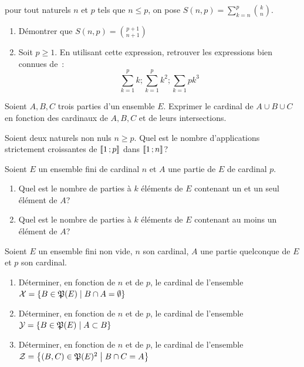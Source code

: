 \begin{exercice}
  pour tout naturels \(n\) et \(p\) tels que \(n \leqslant p\), on pose \(S(n,
  p) = \sum_{k = n}^p \binom{k}{n}\).
  \begin{enumerate}
    \item Démontrer que \(S(n, p) = \binom{p + 1}{n + 1}\)
    \item Soit \(p \geqslant 1\). En utilisant cette expression, retrouver les
      expressions bien connues de~: \[\sum_{k = 1}^p k ; \sum_{k = 1}^p k^2 ;
      \sum_{k = 1}{p} k^3\]
  \end{enumerate}
\end{exercice}

\begin{exercice}
  Soient \(A, B, C\) trois parties d'un ensemble \(E\). Exprimer le cardinal de
  \(A \cup B \cup C\) en fonction des cardinaux de \(A, B, C\) et de leurs
  intersections.
\end{exercice}

\begin{exercice}
  Soient deux naturels non nuls \(n\geqslant p\). Quel est le nombre
  d'applications strictement croissantes de \(\mathopen{\llbracket}1\mathclose{}\mathpunct{};p\mathclose{\rrbracket}\) dans
  \(\mathopen{\llbracket}1\mathclose{}\mathpunct{};n\mathclose{\rrbracket}\)?
\end{exercice}

\begin{exercice}
  Soient \(E\) un ensemble fini de cardinal \(n\) et \(A\) une partie de \(E\)
  de cardinal \(p\).
  \begin{enumerate}
    \item Quel est le nombre de parties à \(k\) éléments de \(E\) contenant un
      et un seul élément de \(A\)?
    \item Quel est le nombre de parties à \(k\) éléments de \(E\) contenant au
      moins un  élément de \(A\)?
  \end{enumerate}
\end{exercice}

\begin{exercice}
  Soient \(E\) un ensemble fini non vide, \(n\) son cardinal, \(A\) une partie
  quelconque de \(E\) et \(p\) son cardinal.
  \begin{enumerate}
    \item Déterminer, en fonction de \(n\) et de \(p\), le cardinal de
      l'ensemble \(\mathcal{X} = \left\{B \in \mathfrak{P}(E)\mathrel{}\middle|\mathrel{}B \cap A = \emptyset\right\}\)
    \item Déterminer, en fonction de \(n\) et de \(p\), le cardinal de
      l'ensemble \(\mathcal{Y} = \left\{B \in \mathfrak{P}(E)\mathrel{}\middle|\mathrel{}A \subset B\right\}\)
    \item Déterminer, en fonction de \(n\) et de \(p\), le cardinal de
      l'ensemble \(\mathcal{Z} = \left\{(B, C) \in \mathfrak{P}(E)^2\mathrel{}\middle|\mathrel{}B \cap C = A\right\}\)
  \end{enumerate}
\end{exercice}
